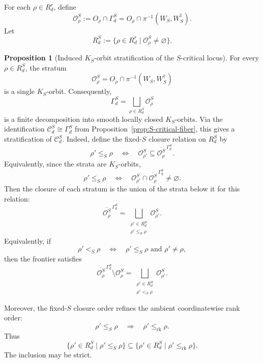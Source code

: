 \documentclass[11pt]{article}
\theoremstyle{definition}
\newtheorem{proposition}[theorem]{Proposition}
\begin{document}
For each \(\rho\in R_d^r\), define
\[
\mathcal O_\rho^S
:=
O_\rho\cap\Gamma_d^S
=
O_\rho\cap\pi^{-1}(W_S,W_S^{\dagger}).
\]
Let
\[
R_d^S
:=
\{\rho\in R_d^r\mid \mathcal O_\rho^S\neq\varnothing\}.
\]

\begin{proposition}[Induced \(K_S\)-orbit stratification of the \(S\)-critical locus]
\label{prop:critical-rank-pattern-stratification}
For every \(\rho\in R_d^S\), the stratum
\[
\mathcal O_\rho^S
=
O_\rho\cap\pi^{-1}(W_S,W_S^{\dagger})
\]
is a single \(K_S\)-orbit. Consequently,
\[
\Gamma_d^S
=
\bigsqcup_{\rho\in R_d^S}\mathcal O_\rho^S
\]
is a finite decomposition into smooth locally closed \(K_S\)-orbits. Via the
identification \(\mathcal C_d^S\cong\Gamma_d^S\) from
Proposition~\ref{prop:S-critical-fiber}, this gives a stratification of
\(\mathcal C_d^S\). Indeed, define the fixed-\(S\) closure relation on \(R_d^S\) by
\[
\rho'\leq_S\rho
\quad\Longleftrightarrow\quad
\mathcal O_{\rho'}^S
\subseteq
\overline{\mathcal O_\rho^S}^{\,\Gamma_d^S}.
\]
Equivalently, since the strata are \(K_S\)-orbits,
\[
\rho'\leq_S\rho
\quad\Longleftrightarrow\quad
\mathcal O_{\rho'}^S
\cap
\overline{\mathcal O_\rho^S}^{\,\Gamma_d^S}
\neq\varnothing.
\]
Then the closure of each stratum is the union of the strata below it for this
relation:
\[
\overline{\mathcal O_\rho^S}^{\,\Gamma_d^S}
=
\bigsqcup_{\substack{\rho'\in R_d^S\\ \rho'\leq_S\rho}}
\mathcal O_{\rho'}^S.
\]
Equivalently, if
\[
\rho'<_S\rho
\quad\Longleftrightarrow\quad
\rho'\leq_S\rho
\text{ and }
\rho'\neq\rho,
\]
then the frontier satisfies
\[
\overline{\mathcal O_\rho^S}^{\,\Gamma_d^S}
\setminus
\mathcal O_\rho^S
=
\bigsqcup_{\substack{\rho'\in R_d^S\\ \rho'<_S\rho}}
\mathcal O_{\rho'}^S.
\]

Moreover, the fixed-\(S\) closure order refines the ambient coordinatewise
rank order:
\[
\rho'\leq_S\rho
\quad\Longrightarrow\quad
\rho'\leq_{\mathrm{rk}}\rho.
\]
Thus
\[
\{\rho'\in R_d^S\mid \rho'\leq_S\rho\}
\subseteq
\{\rho'\in R_d^S\mid \rho'\leq_{\mathrm{rk}}\rho\}.
\]
The inclusion may be strict.
\end{proposition}
\end{document}
